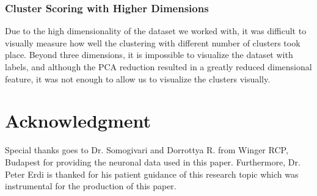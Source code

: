 \documentclass[journal,12pt,onecolumn,draftclsnofoot]{IEEEtran}  %
\begin{document}
\subsubsection{Cluster Scoring with Higher Dimensions}
Due to the high dimensionality of the dataset we worked with, it was difficult to visually measure how well the clustering with different number of clusters took place. Beyond three dimensions, it is impossible to visualize the dataset with labels, and although the PCA reduction resulted in a greatly reduced dimensional feature, it was not enough to allow us to visualize the clusters visually.












\section*{Acknowledgment}
Special thanks goes to Dr. Somogivari and Dorrottya R. from Winger RCP, Budapest for providing the neuronal data used in this paper. Furthermore, Dr. Peter Erdi is thanked for his patient guidance of this research topic which was instrumental for the production of this paper.

\newpage
\begin{appendix}
	
\end{appendix}
\balance


\end{document}

